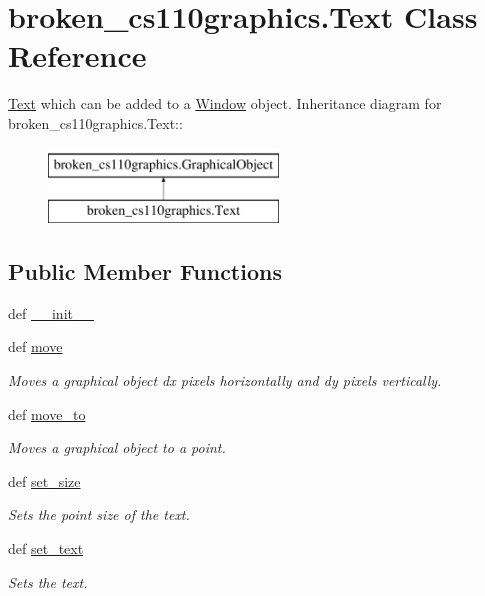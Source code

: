 \hypertarget{classbroken__cs110graphics_1_1Text}{
\section{broken\_\-cs110graphics.Text Class Reference}
\label{classbroken__cs110graphics_1_1Text}
}


\hyperlink{classbroken__cs110graphics_1_1Text}{Text} which can be added to a \hyperlink{classbroken__cs110graphics_1_1Window}{Window} object.  
Inheritance diagram for broken\_\-cs110graphics.Text::\begin{figure}[H]
\begin{center}
\leavevmode
\includegraphics[height=2cm]{classbroken__cs110graphics_1_1Text}
\end{center}
\end{figure}
\subsection*{Public Member Functions}
\begin{DoxyCompactItemize}
\item 
def \hyperlink{classbroken__cs110graphics_1_1Text_aeee37e21cddfdc4ca5c6031f05309965}{\_\-\_\-init\_\-\_\-}
\item 
def \hyperlink{classbroken__cs110graphics_1_1Text_af3be5a72b80b128967fba27b7d9ddaa1}{move}
\begin{DoxyCompactList}\small\item\em Moves a graphical object dx pixels horizontally and dy pixels vertically. \item\end{DoxyCompactList}\item 
def \hyperlink{classbroken__cs110graphics_1_1Text_a7125cca1813d3cf1f3177b736c5f7b92}{move\_\-to}
\begin{DoxyCompactList}\small\item\em Moves a graphical object to a point. \item\end{DoxyCompactList}\item 
def \hyperlink{classbroken__cs110graphics_1_1Text_a113b9948f22c3826e73b73901e911d47}{set\_\-size}
\begin{DoxyCompactList}\small\item\em Sets the point size of the text. \item\end{DoxyCompactList}\item 
def \hyperlink{classbroken__cs110graphics_1_1Text_ae365322ac7b06470cfc4cdc42db859ed}{set\_\-text}
\begin{DoxyCompactList}\small\item\em Sets the text. \item\end{DoxyCompactList}\end{DoxyCompactItemize}


